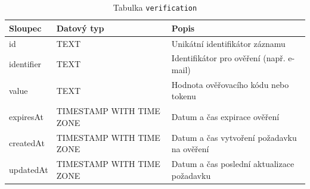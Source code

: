 \begin{table}[ht!]
    \centering
    \begin{tabularx}{\textwidth}{|l|l|L|}
        \hline
        \textbf{Sloupec} & \textbf{Datový typ}      & \textbf{Popis}                             \\ \hline
        id               & TEXT                     & Unikátní identifikátor záznamu             \\ \hline
        identifier       & TEXT                     & Identifikátor pro ověření (např. e-mail)   \\ \hline
        value            & TEXT                     & Hodnota ověřovacího kódu nebo tokenu       \\ \hline
        expiresAt        & TIMESTAMP WITH TIME ZONE & Datum a čas expirace ověření               \\ \hline
        createdAt        & TIMESTAMP WITH TIME ZONE & Datum a čas vytvoření požadavku na ověření \\ \hline
        updatedAt        & TIMESTAMP WITH TIME ZONE & Datum a čas poslední aktualizace požadavku \\ \hline
    \end{tabularx}
    \caption{Tabulka \texttt{verification}}
    \label{tab:verification}
\end{table}
